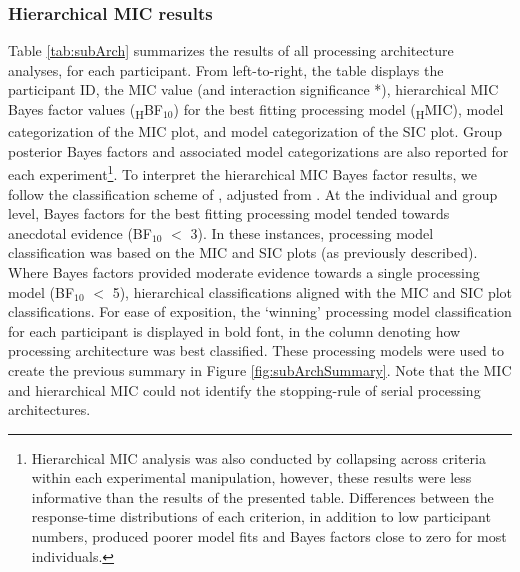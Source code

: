 \subsubsection{Hierarchical MIC results}
Table \ref{tab:subArch} summarizes the results of all processing architecture analyses, for each participant. From left-to-right, the table displays the participant ID, the MIC value (and interaction significance *), hierarchical MIC Bayes factor values (\textsubscript{H}BF$_{10}$) for the best fitting processing model (\textsubscript{H}MIC), model categorization of the MIC plot, and model categorization of the SIC plot. Group posterior Bayes factors and associated model categorizations are also reported for each experiment\footnote{Hierarchical MIC analysis was also conducted by collapsing across criteria within each experimental manipulation, however, these results were less informative than the results of the presented table. Differences between the response-time distributions of each criterion, in addition to low participant numbers, produced poorer model fits and Bayes factors close to zero for most individuals.}. To interpret the hierarchical MIC Bayes factor results, we follow the classification scheme of , adjusted from . At the individual and group level, Bayes factors for the best fitting processing model tended towards anecdotal evidence (BF$_{10}$ $<$ 3). In these instances, processing model classification was based on the MIC and SIC plots (as previously described). Where Bayes factors provided moderate evidence towards a single processing model (BF$_{10}$ $<$ 5), hierarchical classifications aligned with the MIC and SIC plot classifications. For ease of exposition, the `winning' processing model classification for each participant is displayed in bold font, in the column denoting how processing architecture was best classified. These processing models were used to create the previous summary in Figure \ref{fig:subArchSummary}. Note that the MIC and hierarchical MIC could not identify the stopping-rule of serial processing architectures.

